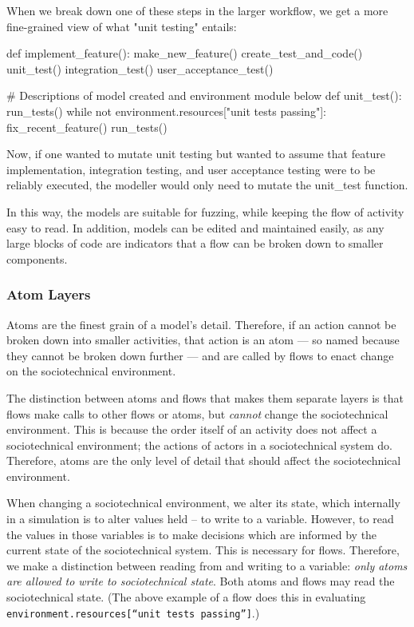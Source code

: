 When we break down one of these steps in the larger workflow, we get a more fine-grained view of what "unit testing" entails:\label{small_code_sample}
\begin{pyglist}[language = python, encoding = utf8, numbers=left, listingname=\textbf{Code sample}, caption={Fine grained view of the earlier top-level workflow}, numbers=left]
def implement_feature():
    make_new_feature()
    create_test_and_code()
    unit_test()
    integration_test()
    user_acceptance_test()

# Descriptions of model created and environment module below
def unit_test():
    run_tests()
    while not environment.resources["unit tests passing"]:
        fix_recent_feature()
        run_tests()
\end{pyglist}\par
Now, if one wanted to mutate unit testing but wanted to assume that feature implementation, integration testing, and user acceptance testing were to be reliably executed, the modeller would only need to mutate the unit\_test\(\) function. \par

In this way, the models are suitable for fuzzing, while keeping the flow of activity easy to read. In addition, models can be edited and maintained easily, as any large blocks of code are indicators that a flow can be broken down to smaller components. \par

\subsubsection{Atom Layers}
Atoms are the finest grain of a model's detail. Therefore, if an action cannot be broken down into smaller activities, that action is an atom --- so named because they cannot be broken down further --- and are called by flows to enact change on the sociotechnical environment. \par

The distinction between atoms and flows that makes them separate layers is that flows make calls to other flows or atoms, but \emph{cannot} change the sociotechnical environment. This is because the order itself of an activity does not affect a sociotechnical environment; the actions of actors in a sociotechnical system do. Therefore, atoms are the only level of detail that should affect the sociotechnical environment. \par

When changing a sociotechnical environment, we alter its state, which internally in a simulation is to alter values held -- to write to a variable. However, to read the values in those variables is to make decisions which are informed by the current state of the sociotechnical system. This is necessary for flows. Therefore, we make a distinction between reading from and writing to a variable: \emph{only atoms are allowed to write to sociotechnical state}. Both atoms and flows may read the sociotechnical state. (The above example of a flow does this in evaluating \texttt{environment.resources[``unit tests passing'']}.)\par

